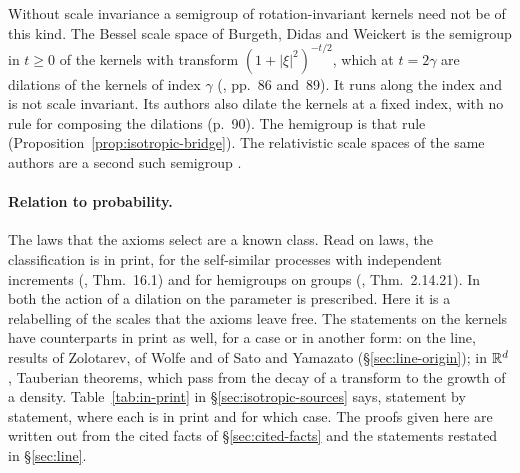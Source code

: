 Without scale invariance a semigroup of rotation-invariant kernels need not be of this kind. The
Bessel scale space of Burgeth, Didas and Weickert is the semigroup in $t \ge 0$ of the kernels
with transform $(1 + |\xi|^2)^{-t/2}$, which at $t = 2\gamma$ are dilations of the \Matern{}
kernels of index $\gamma$ (, pp.~86 and~89). It runs along the index
and is not scale invariant. Its authors also dilate the kernels at a fixed index, with no rule
for composing the dilations (p.~90). The hemigroup is that rule
(Proposition~\ref{prop:isotropic-bridge}). The relativistic scale spaces of the same authors
are a second such semigroup .

\paragraph{Relation to probability.} The laws that the axioms select are a known class. Read on
laws, the classification is in print, for the self-similar processes with independent
increments (, Thm.~16.1) and for hemigroups on groups
(, Thm.~2.14.21). In both the action of a
dilation on the parameter is prescribed. Here it is a relabelling of the scales that the axioms
leave free. The statements on the kernels have counterparts in print as well, for a case or in
another form: on the line, results of Zolotarev, of Wolfe and of Sato and Yamazato
(\S\ref{sec:line-origin}); in $\mathbb{R}^d$, Tauberian theorems, which pass from the decay of a
transform to the growth of a density. Table~\ref{tab:in-print} in
\S\ref{sec:isotropic-sources} says, statement by statement, where each is in print and for
which case. The proofs given here are written out from the cited facts of
\S\ref{sec:cited-facts} and the statements restated in \S\ref{sec:line}.

